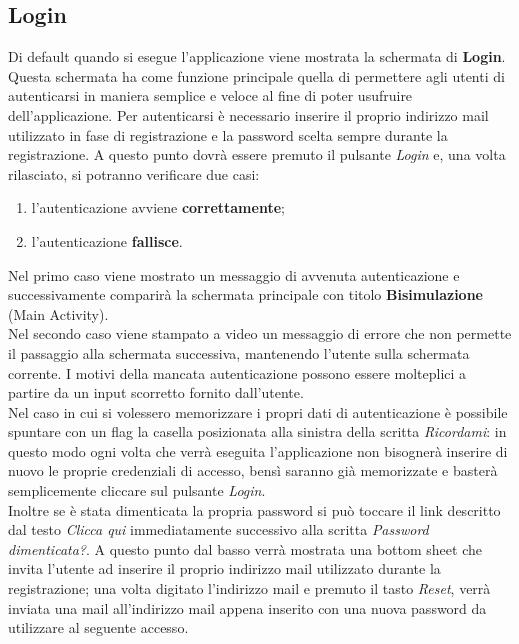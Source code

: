 \documentclass[a4paper,12pt,twoside,openright]{report}
\begin{document}
\subsection{Login}
Di default quando si esegue l'applicazione viene mostrata la schermata di \textbf{Login}. Questa schermata ha come funzione principale quella di permettere agli utenti
di autenticarsi in maniera semplice e veloce al fine di poter usufruire dell'applicazione. Per autenticarsi è necessario inserire il proprio indirizzo mail utilizzato in 
fase di registrazione e la password scelta sempre durante la registrazione. A questo punto dovrà essere premuto il pulsante \textit{Login} e, una volta rilasciato,
si potranno verificare due casi:

\begin{enumerate}
\item l'autenticazione avviene \textbf{correttamente};

\item l'autenticazione \textbf{fallisce}.
\end{enumerate}
 
Nel primo caso viene mostrato un messaggio di avvenuta autenticazione e successivamente comparirà la schermata principale con titolo \textbf{Bisimulazione} (Main Activity).\\
Nel secondo caso viene stampato a video un messaggio di errore che non permette il passaggio alla schermata successiva, mantenendo l'utente sulla schermata
corrente. I motivi della mancata autenticazione possono essere molteplici a partire da un input scorretto fornito dall'utente.\\
Nel caso in cui si volessero memorizzare i propri dati di autenticazione è possibile spuntare con un flag la casella posizionata alla sinistra della scritta \textit{Ricordami}: in
questo modo ogni volta che verrà eseguita l'applicazione non bisognerà inserire di nuovo le proprie credenziali di accesso, bensì saranno già memorizzate e basterà
semplicemente cliccare sul pulsante \textit{Login}.\\
Inoltre se è stata dimenticata la propria password si può toccare il link descritto dal testo \textit{Clicca qui} immediatamente successivo alla scritta \textit{Password dimenticata?}.
A questo punto dal basso verrà mostrata una bottom sheet che invita l'utente ad inserire il proprio indirizzo mail utilizzato durante la registrazione; una volta digitato
 l'indirizzo mail e premuto il tasto \textit{Reset}, verrà inviata una mail all'indirizzo mail appena inserito con una nuova password da utilizzare al seguente accesso.\\
\end{document}
